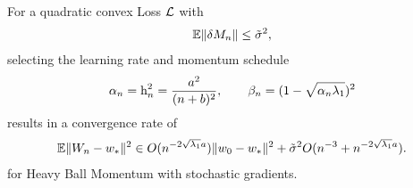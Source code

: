 \begin{theorem}
	For a quadratic convex Loss \(\mathcal{L}\) with
	\begin{align*}
		\mathbb{E}\|\delta M_n\|\le \tilde{\sigma}^2,
	\end{align*} 
	selecting the learning rate and momentum
	schedule
	\begin{align*}
		\alpha_n = \text{h}_n^2 = \frac{a^2}{(n+b)^2}, \qquad \beta_n=(1-\sqrt{\alpha_n\lambda_1})^2
	\end{align*}
	results in a convergence rate of 
	\begin{align*}
		\mathbb{E}\|W_n -w_*\|^2 \in O(n^{-2\sqrt{\lambda_1}a})\|w_0 - w_*\|^2
		+ \tilde{\sigma}^2 O(n^{-3}+n^{-2\sqrt{\lambda_1} a}).
	\end{align*}
	for Heavy Ball Momentum with stochastic gradients.
\end{theorem}
